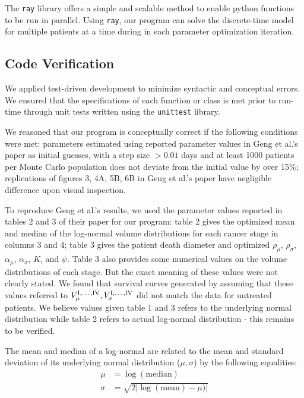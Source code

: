 \documentclass[letterpaper
, superscriptaddress
, twocolumn
, aps
]{revtex4}
\begin{document}
The \texttt{ray} library \cite{Moritz2017} offers a simple and scalable method to enable python functions to be run in parallel. Using \texttt{ray}, our program can solve the discrete-time model for multiple patients at a time during in each parameter optimization iteration. 

\subsection{Code Verification}

We applied test-driven development to minimize syntactic and conceptual errors. We ensured that the specifications of each function or class is met prior to run-time through unit tests written using the \texttt{unittest} library. 

We reasoned that our program is conceptually correct if the following conditions were met: parameters estimated using reported parameter values in Geng et al.'s paper as initial guesses, with a step size $> 0.01$ days and at least 1000 patients per Monte Carlo population does not deviate from the initial value by over 15\%; replications of figures 3, 4A, 5B, 6B in Geng et al.'s paper have negligible difference upon visual inspection.

To reproduce Geng et al.'s results, we used the parameter values reported in tables 2 and 3 of their paper for our program: table 2 gives the optimized mean and median of the log-normal volume distributions for each cancer stage in columns 3 and 4; table 3 gives the patient death diameter and optimized $\rho_{\mu}$, $\rho_{\sigma}$, $\alpha_{\mu}$, $\alpha_{\sigma}$, $K$, and $\psi$. Table 3 also provides some numerical values on the volume distributions of each stage. But the exact meaning of these values were not clearly stated. We found that survival curves generated by assuming that these values referred to $V_{\mu}^{\text{I,\dots,IV}}, V_{\sigma}^{\text{I,\dots,IV}}$ did not match the data for untreated patients. We believe values given table 1 and 3 refers to the underlying normal distribution while table 2 refers to actual log-normal distribution - this remains to be verified. 

The mean and median of a log-normal are related to the mean and standard deviation of its underlying normal distribution ($\mu, \sigma$) by the following equalities:
\begin{align*}
\mu &= \log \left( \text{median} \right)\\
\sigma &= \sqrt{2 | \log(\text{mean}) - \mu) |}
\end{align*}
\end{document}
